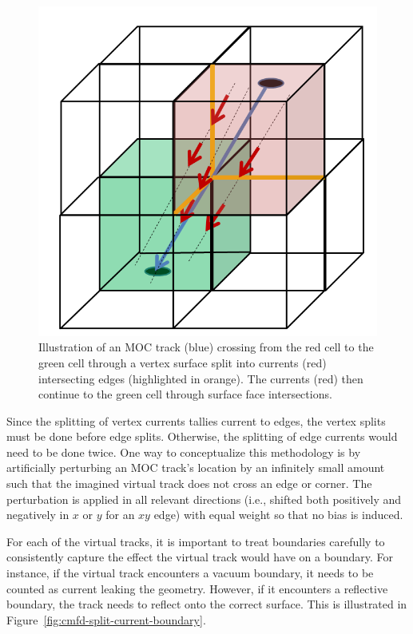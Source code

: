 \begin{figure}[h!]
	\centering
	\includegraphics[width=0.6\linewidth]{figures/DD/vertex-split.PNG}
	\caption[]{Illustration of an \ac{MOC} track (blue) crossing from the red cell to the green cell through a vertex surface split into currents (red) intersecting edges (highlighted in orange). The currents (red) then continue to the green cell through surface face intersections.}
	\label{fig:cmfd-split-vertex}
\end{figure}

Since the splitting of vertex currents tallies current to edges, the vertex splits must be done before edge splits. Otherwise, the splitting of edge currents would need to be done twice. One way to conceptualize this methodology is by artificially perturbing an \ac{MOC} track's location by an infinitely small amount such that the imagined virtual track does not cross an edge or corner. The perturbation is applied in all relevant directions (i.e., shifted both positively and negatively in $x$ or $y$ for an $xy$ edge) with equal weight so that no bias is induced. 

For each of the virtual tracks, it is important to treat boundaries carefully to consistently capture the effect the virtual track would have on a boundary. For instance, if the virtual track encounters a vacuum boundary, it needs to be counted as current leaking the geometry. However, if it encounters a reflective boundary, the track needs to reflect onto the correct surface. This is illustrated in Figure~\ref{fig:cmfd-split-current-boundary}. 


